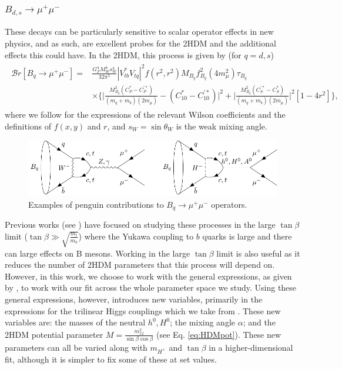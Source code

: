 \documentclass[a4paper,12pt]{article}
\begin{document}
\subsubsection{$B_{d,s}\to\mu^+\mu^-$}
These decays can be particularly sensitive to scalar operator effects in new physics, and as such, are excellent probes for the 2HDM and the additional effects this could have. 
In the 2HDM, this process is given by (for $q=d,s$)
\begin{align}
    \begin{split}
        \mathcal{B}r[B_{q}\to\mu^+\mu^-] = &\frac{G^4_FM_W^4s_W^4}{32\pi^5}|V_{tb}^*V_{tq}|^2f(r^2,r^2)M_{B_q}f_{B_q}^2(4m_\mu^2)\tau_{B_q} \\
                                           &\times\Bigg\{\bigg|\frac{M_{B_q}^2(C_P^*-C_P^{'*})}{(m_q+m_b)(2m_\mu)}-(C_{10}^*-C_{10}^{'*})\bigg|^2 +\bigg|\frac{M_{B_q}^2(C_S^{'*}-C_S^*)}{(m_q+m_b)(2m_\mu)}\bigg|^2\left[1-4r^2\right]\Bigg\},
    \end{split}
\end{align}
where we follow \cite{criv} for the expressions of the relevant Wilson coefficients and the definitions of $f(x,y)$ and $r$, and $s_W=\sin\theta_W$ is the weak mixing angle. 
\begin{figure}[H]
    \centering
    \includegraphics[width=\textwidth]{bsmu.pdf}
    \caption{\label{fig:bspeng}Examples of penguin contributions to $B_q\to\mu^+\mu^-$ operators.}
\end{figure}
Previous works (see \cite{lrgtb}) have focused on studying these processes in the large $\tan\beta$ limit ($\tan\beta\gg\sqrt{\frac{m_t}{m_b}}$) where the Yukawa coupling to $b$ quarks is large and there can large effects on B mesons. 
Working in the large $\tan\beta$ limit is also useful as it reduces the number of 2HDM parameters that this process will depend on. 
However, in this work, we choose to work with the general expressions, as given by \cite{criv}, to work with our fit across the whole parameter space we study. 
Using these general expressions, however, introduces new variables, primarily in the expressions for the trilinear Higgs couplings which we take from \cite{trilin}.
These new variables are: the masses of the neutral $h^0,H^0$; the mixing angle $\alpha$; and the 2HDM potential parameter $M=\frac{m_{12}^2}{\sin\beta\cos\beta}$ (see Eq. \ref{eq:HDMpot}). 
These new parameters can all be varied along with $m_{H^+}$ and $\tan\beta$ in a higher-dimensional fit, although it is simpler to fix some of these at set values. 
\end{document}

